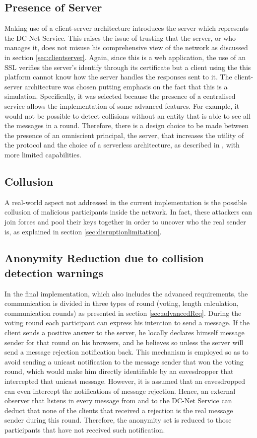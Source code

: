 \subsection{Presence of Server} \label{sec:evalServerPresence}
Making use of a client-server architecture introduces the server which represents the DC-Net Service. This raises the issue of trusting that the server, or who manages it, does not misuse his comprehensive view of the network as discussed in section \ref{sec:clientserver}. Again, since this is a web application, the use of an SSL verifies the server's identify through its certificate but a client using the this platform cannot know how the server handles the responses sent to it. The client-server architecture was chosen putting emphasis on the fact that this is a simulation. Specifically, it was selected because the presence of a centralised service allows the implementation of some advanced features. For example, it would not be possible to detect collisions without an entity that is able to see all the messages in a round. Therefore, there is a design choice to be made between the presence of an omniscient principal, the server, that increases the utility of the protocol and the choice of a serverless architecture, as described in \cite{Scholz}, with more limited capabilities.

\subsection{Collusion}
A real-world aspect not addressed in the current implementation is the possible collusion of malicious participants inside the network. In fact, these attackers can join forces and pool their keys together in order to uncover who the real sender is, as explained in section \ref{sec:disruptionlimitation}.

\subsection{Anonymity Reduction due to collision detection warnings} \label{sec:anonymityReductionLimitation}
In the final implementation, which also includes the advanced requirements, the communication is divided in three types of round (voting, length calculation, communication rounds) as presented in section \ref{sec:advancedReq}. During the voting round each participant can express his intention to send a message. If the client sends a positive answer to the server, he locally declares himself message sender for that round on his browsers, and he believes so unless the server will send a message rejection notification back. This mechanism is employed so as to avoid sending a unicast notification to the message sender that won the voting round, which would make him directly identifiable by an eavesdropper that intercepted that unicast message. However, it is assumed that an eavesdropped can even intercept the notifications of message rejection. Hence, an external observer that listens in every message from and to the DC-Net Service can deduct that none of the clients that received a rejection is the real message sender during this round. Therefore, the anonymity set is reduced to those participants that have not received such notification.

